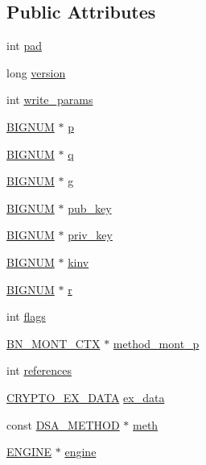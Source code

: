 \subsection*{Public Attributes}
\begin{DoxyCompactItemize}
\item 
int \hyperlink{structdsa__st_abdf71672c40a2cd7d02bc8f86f33d3c9}{pad}
\item 
long \hyperlink{structdsa__st_a9aa35c728a9166c0671f4286f7f367cc}{version}
\item 
int \hyperlink{structdsa__st_a4b48d1347fa55e2f68cc991d98c2daf2}{write\+\_\+params}
\item 
\hyperlink{ossl__typ_8h_a6fb19728907ec6515e4bfb716bffa141}{B\+I\+G\+N\+UM} $\ast$ \hyperlink{structdsa__st_a63246fbe0fc27945bd32765e5538a1a6}{p}
\item 
\hyperlink{ossl__typ_8h_a6fb19728907ec6515e4bfb716bffa141}{B\+I\+G\+N\+UM} $\ast$ \hyperlink{structdsa__st_ab0cae8e320e604e2f4d18066bb02a097}{q}
\item 
\hyperlink{ossl__typ_8h_a6fb19728907ec6515e4bfb716bffa141}{B\+I\+G\+N\+UM} $\ast$ \hyperlink{structdsa__st_af5ec97a996fd695c0186eb5a9a2b0b38}{g}
\item 
\hyperlink{ossl__typ_8h_a6fb19728907ec6515e4bfb716bffa141}{B\+I\+G\+N\+UM} $\ast$ \hyperlink{structdsa__st_a2a844d480ca7c1a73dadeee215863fa6}{pub\+\_\+key}
\item 
\hyperlink{ossl__typ_8h_a6fb19728907ec6515e4bfb716bffa141}{B\+I\+G\+N\+UM} $\ast$ \hyperlink{structdsa__st_a42c62516432a22cae5b2092c8276deaa}{priv\+\_\+key}
\item 
\hyperlink{ossl__typ_8h_a6fb19728907ec6515e4bfb716bffa141}{B\+I\+G\+N\+UM} $\ast$ \hyperlink{structdsa__st_a73b0fb2db5b8546f779cb157b18f19fc}{kinv}
\item 
\hyperlink{ossl__typ_8h_a6fb19728907ec6515e4bfb716bffa141}{B\+I\+G\+N\+UM} $\ast$ \hyperlink{structdsa__st_ab301cd06470fbfae28764c2115b60d97}{r}
\item 
int \hyperlink{structdsa__st_a3c27d330e3e07368715455b5a019690d}{flags}
\item 
\hyperlink{ossl__typ_8h_aec902d353e00ced6d3fee6cd033a8bd0}{B\+N\+\_\+\+M\+O\+N\+T\+\_\+\+C\+TX} $\ast$ \hyperlink{structdsa__st_aea9e4de390af7d5bc289a203824ffb5f}{method\+\_\+mont\+\_\+p}
\item 
int \hyperlink{structdsa__st_a4a1337f8a116a7f1b322639edfa9d580}{references}
\item 
\hyperlink{ossl__typ_8h_a7eaff1c18057495d8af18f22d1370b51}{C\+R\+Y\+P\+T\+O\+\_\+\+E\+X\+\_\+\+D\+A\+TA} \hyperlink{structdsa__st_a0def4851606ac230c65f4409de2c0c71}{ex\+\_\+data}
\item 
const \hyperlink{ossl__typ_8h_a605b811328e2faab9b3c496ce21e0750}{D\+S\+A\+\_\+\+M\+E\+T\+H\+OD} $\ast$ \hyperlink{structdsa__st_af5e872d3d77bbba895b6b917f1a71d3a}{meth}
\item 
\hyperlink{ossl__typ_8h_abac45b251498719318e60ab8d6192510}{E\+N\+G\+I\+NE} $\ast$ \hyperlink{structdsa__st_a0cfa8000f47729c5eb6cc2053eb01b75}{engine}
\end{DoxyCompactItemize}


